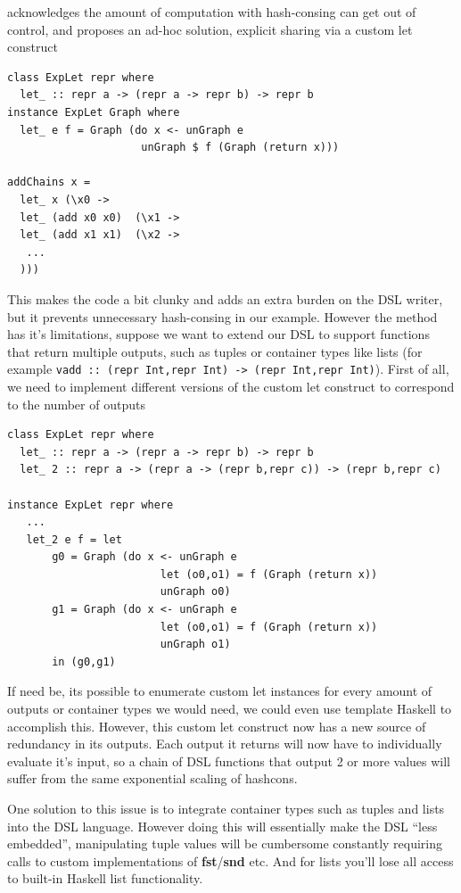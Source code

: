 \documentclass[runningheads]{llncs}
\begin{document}
\cite{kiselyov:sharing} acknowledges the amount of computation with hash-consing
can get out of control, and proposes an ad-hoc solution, explicit sharing via a
custom let construct
\begin{verbatim}
class ExpLet repr where
  let_ :: repr a -> (repr a -> repr b) -> repr b
instance ExpLet Graph where
  let_ e f = Graph (do x <- unGraph e
                     unGraph $ f (Graph (return x)))

addChains x =
  let_ x (\x0 ->
  let_ (add x0 x0)  (\x1 ->
  let_ (add x1 x1)  (\x2 ->
   ...
  )))
\end{verbatim}
This makes the code a bit clunky and adds an extra burden on the DSL
writer, but it prevents unnecessary hash-consing in our example. However the
method has it's limitations, suppose we want to extend our DSL to support
functions that return multiple outputs, such as tuples or container types like
lists (for example \texttt{vadd :: (repr Int,repr Int) -> (repr Int,repr
  Int)}). First of all, we need to implement different versions of the custom let
construct to correspond to the number of outputs
\begin{verbatim}
class ExpLet repr where
  let_ :: repr a -> (repr a -> repr b) -> repr b
  let_ 2 :: repr a -> (repr a -> (repr b,repr c)) -> (repr b,repr c)

instance ExpLet repr where
   ...
   let_2 e f = let
       g0 = Graph (do x <- unGraph e
                        let (o0,o1) = f (Graph (return x))
                        unGraph o0)
       g1 = Graph (do x <- unGraph e
                        let (o0,o1) = f (Graph (return x))
                        unGraph o1)
       in (g0,g1)
\end{verbatim}
If need be, its possible to enumerate custom let instances for every amount of
outputs or container types we would need, we could even use template Haskell to
accomplish this. However, this custom let construct now has a new source of
redundancy in its outputs. Each output it returns will now have to individually
evaluate it's input, so a chain of DSL functions that output 2 or more values
will suffer from the same exponential scaling of hashcons.

One solution to this issue is to integrate container types such as tuples and lists
into the DSL language. However doing this will essentially make the DSL ``less
embedded'', manipulating tuple values will be cumbersome constantly requiring
calls to custom implementations of {\bf fst}/{\bf snd} etc. And for lists you'll
lose all access to built-in Haskell list functionality.
\end{document}
